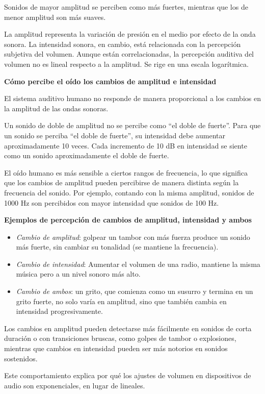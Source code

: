 Sonidos de mayor amplitud se perciben como más fuertes, mientras que los de menor amplitud son más suaves.

\begin{tcolorbox}[title=Relación entre Amplitud e Intensidad,colback=gray!10, colframe=gray!50, sharp corners=south]
La amplitud representa la variación de presión en el medio por efecto de la onda sonora. La intensidad sonora, en cambio, está relacionada con la percepción subjetiva del volumen. Aunque están correlacionadas, la percepción auditiva del volumen no es lineal respecto a la amplitud. Se rige en una escala logarítmica.\vspace{10pt}

\parbox{\textwidth}{\textbf{Cómo percibe el oído los cambios de amplitud e intensidad}}
El sistema auditivo humano no responde de manera proporcional a los cambios en la amplitud de las ondas sonoras.

Un sonido de doble de amplitud no se percibe como ``el doble de fuerte''. Para que un sonido se perciba ``el doble de fuerte'', su intensidad debe aumentar aproximadamente 10 veces. Cada incremento de 10 dB en intensidad se siente como un sonido aproximadamente el doble de fuerte.

El oído humano es más sensible a ciertos rangos de frecuencia, lo que significa que los cambios de amplitud pueden percibirse de manera distinta según la frecuencia del sonido. Por ejemplo, contando con la misma amplitud, sonidos de 1000 Hz son percibidos con mayor intensidad que sonidos de 100 Hz.\vspace{10pt}

\parbox{\textwidth}{\textbf{Ejemplos de percepción de cambios de amplitud, intensidad y ambos}}
\begin{itemize}
    \item \emph{Cambio de amplitud}: golpear un tambor con más fuerza produce un sonido más fuerte, sin cambiar su tonalidad (se mantiene la frecuencia).
    \item \emph{Cambio de intensidad}: Aumentar el volumen de una radio, mantiene la misma música pero a un nivel sonoro más alto.
    \item \emph{Cambio de ambos}: un grito, que comienza como un susurro y termina en un grito fuerte, no solo varía en amplitud, sino que también cambia en intensidad progresivamente.
\end{itemize}

Los cambios en amplitud pueden detectarse más fácilmente en sonidos de corta duración o con transiciones bruscas, como golpes de tambor o explosiones, mientras que cambios en intensidad pueden ser más notorios en sonidos sostenidos.

Este comportamiento explica por qué los ajustes de volumen en dispositivos de audio son exponenciales, en lugar de lineales.
\end{tcolorbox}


